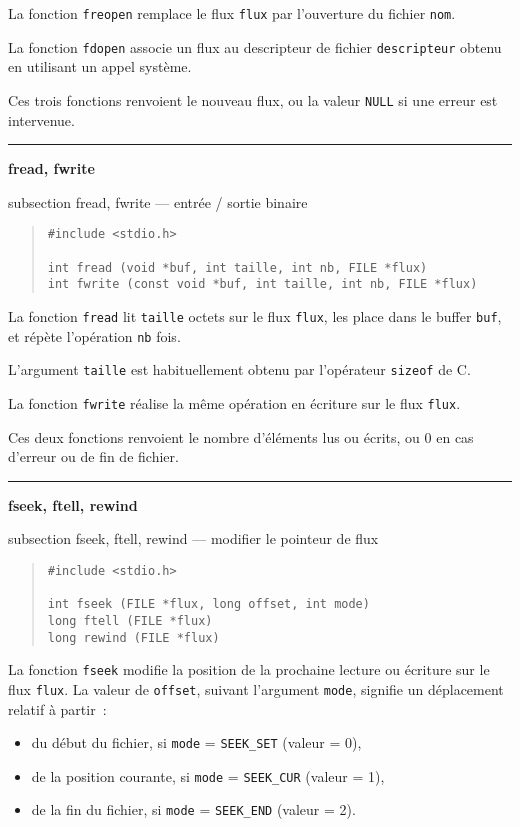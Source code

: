 \documentclass [twoside] {report}
\newcommand {\primitive} [1]
    {
	{\large \bf #1}
	\addcontentsline {toc} {subsection} {#1}
    }
\newcommand {\separation}
    {
	\vspace {7mm}
	\nopagebreak
	\hrule
    }
\begin{document}
La fonction {\tt freopen} remplace le flux {\tt flux} par
l'ouverture du fichier {\tt nom}.

La fonction {\tt fdopen} associe un flux au descripteur de
fichier {\tt descripteur} obtenu en utilisant un appel
système.

Ces trois fonctions renvoient le nouveau flux, ou la valeur
{\tt NULL} si une erreur est intervenue.



\separation
\primitive {fread, fwrite} --- entrée / sortie binaire

\begin {quote}
\begin {verbatim}
#include <stdio.h>

int fread (void *buf, int taille, int nb, FILE *flux)
int fwrite (const void *buf, int taille, int nb, FILE *flux)
\end{verbatim}
\end {quote}

La fonction {\tt fread} lit {\tt taille} octets sur le flux
{\tt flux}, les place dans le buffer {\tt buf}, et répète
l'opération {\tt nb} fois.

L'argument {\tt taille} est habituellement obtenu par
l'opérateur {\tt sizeof} de C.

La fonction {\tt fwrite} réalise la même opération en écriture
sur le flux {\tt flux}.

Ces deux fonctions renvoient le nombre d'éléments lus ou
écrits, ou 0 en cas d'erreur ou de fin de fichier.



\separation
\primitive {fseek, ftell, rewind} --- modifier le pointeur de flux

\begin {quote}
\begin {verbatim}
#include <stdio.h>

int fseek (FILE *flux, long offset, int mode)
long ftell (FILE *flux)
long rewind (FILE *flux)
\end{verbatim}
\end {quote}

La fonction {\tt fseek} modifie la position de la prochaine
lecture ou écriture sur le flux {\tt flux}. La valeur de
{\tt offset}, suivant l'argument {\tt mode}, signifie un
déplacement relatif à partir~:

\begin {itemize}
\item du début du fichier, si {\tt mode} = {\tt SEEK\_SET} (valeur = 0),
\item de la position courante, si {\tt mode} = {\tt SEEK\_CUR} (valeur = 1),
\item de la fin du fichier, si {\tt mode} = {\tt SEEK\_END} (valeur = 2).
\end {itemize}
\end{document}
